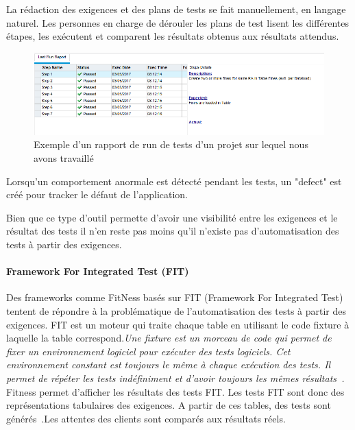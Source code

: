         La rédaction des exigences et des plans de tests se fait manuellement, en langage naturel. Les personnes en charge de dérouler les plans de test lisent les différentes étapes, les exécutent et comparent les résultats obtenus aux résultats attendus.
        
            \begin{figure}[H]
                \centering
                \includegraphics[width=\textwidth]{images/qc.png}
                \caption{Exemple d'un rapport de run de tests d'un projet sur lequel nous avons travaillé}
            \end{figure}
        
        Lorsqu’un comportement anormale est détecté pendant les tests, un "defect" est créé pour tracker le défaut de l’application.
        
        Bien que ce type d’outil permette d’avoir une visibilité entre les exigences et le résultat des tests il n’en reste pas moins qu’il n’existe pas d’automatisation des tests à partir des exigences.
        
        \paragraph{Framework For Integrated Test (FIT)}
        
        Des frameworks comme FitNess\cite{fitnesse} basés sur FIT (Framework For Integrated Test) tentent de répondre à la problématique de l’automatisation des tests à partir des exigences. FIT est un moteur qui traite chaque table en utilisant le code fixture à laquelle la table correspond.\textit{\guillemotleft Une fixture est un morceau de code qui permet de fixer un environnement logiciel pour exécuter des tests logiciels. Cet environnement constant est toujours le même à chaque exécution des tests. Il permet de répéter les tests indéfiniment et d'avoir toujours les mêmes résultats~\cite{fixture}.\guillemotright}
        Fitness permet d'afficher les résultats des tests FIT. Les tests FIT sont donc des représentations tabulaires des exigences. A partir de ces tables, des tests sont générés~\cite{article6}.Les attentes des clients sont comparés aux résultats réels.~\cite{fitnesse}


